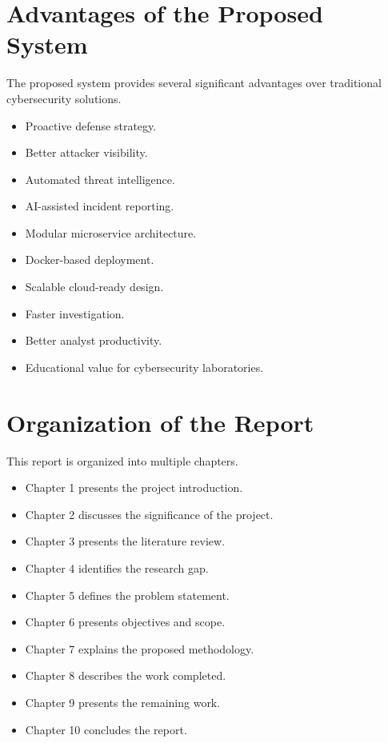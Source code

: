 \documentclass[12pt,a4paper]{report}
\begin{document}

\section{Advantages of the Proposed System}

The proposed system provides several significant advantages over traditional cybersecurity solutions.

\begin{itemize}
\item Proactive defense strategy.
\item Better attacker visibility.
\item Automated threat intelligence.
\item AI-assisted incident reporting.
\item Modular microservice architecture.
\item Docker-based deployment.
\item Scalable cloud-ready design.
\item Faster investigation.
\item Better analyst productivity.
\item Educational value for cybersecurity laboratories.
\end{itemize}


\section{Organization of the Report}

This report is organized into multiple chapters.

\begin{itemize}
\item Chapter 1 presents the project introduction.
\item Chapter 2 discusses the significance of the project.
\item Chapter 3 presents the literature review.
\item Chapter 4 identifies the research gap.
\item Chapter 5 defines the problem statement.
\item Chapter 6 presents objectives and scope.
\item Chapter 7 explains the proposed methodology.
\item Chapter 8 describes the work completed.
\item Chapter 9 presents the remaining work.
\item Chapter 10 concludes the report.
\end{itemize}
\end{document}
